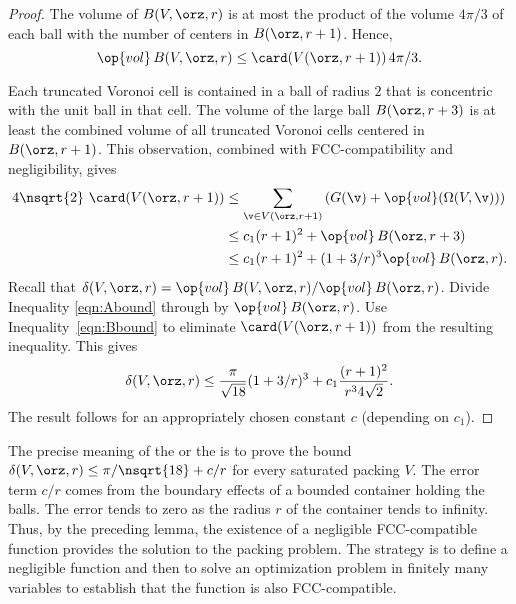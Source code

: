 \begin{cnl}
\begin{proof} 
The volume of $\openBall{ V}{\orz,r}$ is at most the product of the volume
$4\pi/3$ of each ball with the number of centers in
$\openBall{\orz}{r+1}$.  Hence,
\begin{equation} \label{eqn:Abound}
\op{vol}\, \openBall{ V}{\orz,r} \le \card( \Vee{V}(\orz,r+1))\, 4\pi/3.
\end{equation}


Each truncated Voronoi cell is contained in a ball of radius $2$ that
is concentric with the unit ball in that cell.  The volume of the
large ball $\openBall{\orz}{r+3}$ is at least the combined volume of all
truncated Voronoi cells centered in $\openBall{\orz}{r+1}$. This observation,
combined with FCC-compatibility and negligibility, gives
\begin{equation} 
\begin{split} 
4\nsqrt{2}\,\,\card( \Vee{V}(\orz,r+1))
&\le \sumfinitepred{\v}{\v\in \Vee{V}(\orz,r+1)}{\left(G(\v) +
\op{vol}(\Omega(V,\v))\right)} \\
&\le c_1 (r+1)^2 + \op{vol}\,\openBall{\orz}{r+3} \\
&\le c_1 (r+1)^2 + (1+3/r)^3 \op{vol}\,\openBall{\orz}{r}.
\label{eqn:Bbound}
\end{split}
\end{equation}
%
Recall that $\delta( V,\orz,r)=
\op{vol}\,\openBall{ V}{\orz,r}/\op{vol}\,\openBall{\orz}{r}$. Divide Inequality
\ref{eqn:Abound} through by $\op{vol}\,\openBall{\orz}{r}$.  Use
Inequality~\ref{eqn:Bbound} to eliminate $\card( \Vee{V}(\orz,r+1))$ from the
resulting inequality.  This gives
\[ \delta( V,\orz,r)
\le \frac{\pi}{\sqrt{18}} (1+3/r)^3 + c_1 \frac{(r+1)^2}{r^34\sqrt{2}}.
\] 
The result follows for an appropriately chosen constant $c$
(depending on $c_1$).
\end{proof}


\begin{remark}
\label{remark:precise} 
The precise meaning of the  or the
 is to prove the bound $\delta(
V,\orz,r) \le \pi/\nsqrt{18} + c/r$ for every saturated packing $ V$.
The error term $c/r$ comes from the boundary effects of a bounded
container holding the balls.  The error tends to zero as the radius
$r$ of the container tends to infinity.  Thus, by the preceding lemma,
the existence of a negligible FCC-compatible function provides the
solution to the packing problem.  The strategy is to define a
negligible function and then to solve an optimization problem in
finitely many variables to establish that the function is also
FCC-compatible.
\end{remark}



\end{cnl}
